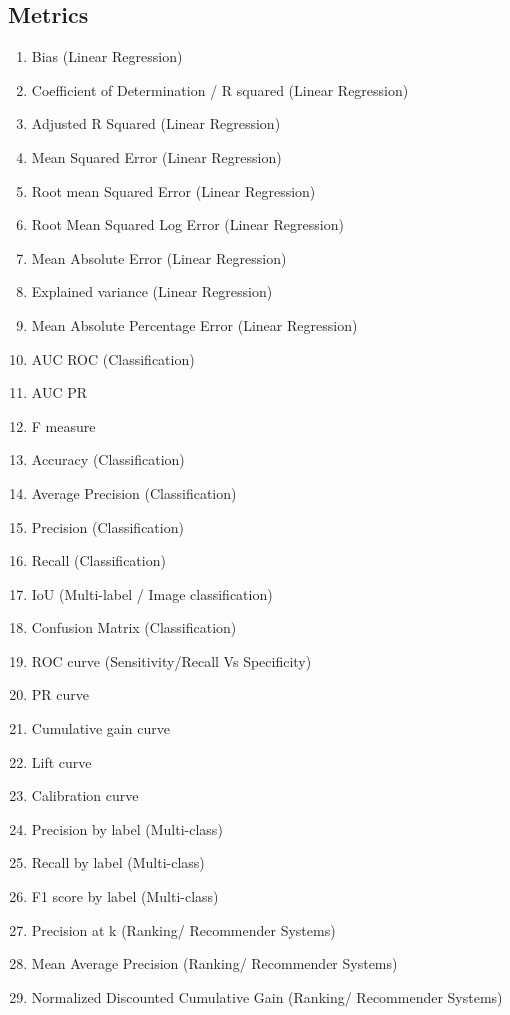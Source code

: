 \documentclass[12pt,letterpaper, onecolumn]{exam}
\begin{document}
 \subsection*{Metrics}
 \begin{enumerate}
 \item Bias  (Linear Regression) 
\item Coefficient of Determination / R squared (Linear Regression)
\item Adjusted R Squared (Linear Regression)
\item Mean Squared Error (Linear Regression)
\item Root mean Squared Error (Linear Regression)
\item Root Mean Squared Log Error (Linear Regression)
\item Mean Absolute Error (Linear Regression)
\item Explained variance (Linear Regression)
\item Mean Absolute Percentage Error (Linear Regression)
\item AUC ROC (Classification)
\item AUC PR 
\item F measure
\item Accuracy (Classification)
\item Average Precision (Classification)
\item Precision (Classification)
\item Recall (Classification)
\item IoU (Multi-label / Image classification)
\item Confusion Matrix (Classification)
\item ROC curve (Sensitivity/Recall Vs Specificity)
\item PR curve
\item Cumulative gain curve
\item Lift curve
\item Calibration curve
\item Precision by label (Multi-class)
\item Recall by label (Multi-class)
\item F1 score by label (Multi-class)
\item Precision at k (Ranking/ Recommender Systems)
\item Mean Average Precision (Ranking/ Recommender Systems)
\item Normalized Discounted Cumulative Gain (Ranking/ Recommender Systems)
 \end{enumerate}
 
\end{document}
